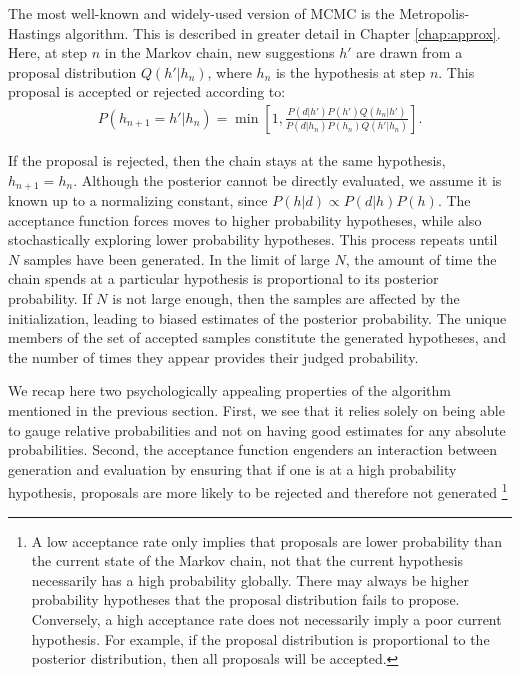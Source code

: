 The most well-known and widely-used version of MCMC is the Metropolis-Hastings algorithm. This is described in greater detail in Chapter \ref{chap:approx}. Here, at step $n$ in the Markov chain, new suggestions $h'$ are drawn from a proposal distribution $Q(h'|h_n)$, where $h_n$ is the hypothesis at step $n$. This proposal is accepted or rejected according to:
\begin{align}
P(h_{n+1}=h'|h_n) = \min\left[1, \frac{P(d|h')P(h') Q(h_n|h')}{P(d|h_n) P(h_n) Q(h'|h_n)} \right].
\end{align}

If the proposal is rejected, then the chain stays at the same hypothesis, $h_{n+1}=h_n$. Although the posterior cannot be directly evaluated, we assume it is known up to a normalizing constant, since $P(h|d) \propto P(d|h) P(h)$. The acceptance function forces moves to higher probability hypotheses, while also stochastically exploring lower probability hypotheses. This process repeats until $N$ samples have been generated. 
In the limit of large $N$, the amount of time the chain spends at a particular hypothesis is proportional to its posterior probability. If $N$ is not large enough, then the samples are affected by the initialization, leading to biased estimates of the posterior probability.
The unique members of the set of accepted samples constitute the generated hypotheses, and the number of times they appear provides their judged probability.

We recap here two psychologically appealing properties of the algorithm mentioned in the previous section. First, we see that it relies solely on being able to gauge relative probabilities and not on having good estimates for any absolute probabilities. Second, the acceptance function engenders an interaction between generation and evaluation by ensuring that if one is at a high probability hypothesis, proposals are more likely to be rejected and therefore not generated%
\footnote{A low acceptance rate only implies that proposals are lower probability than the current state of the Markov chain, not that the current hypothesis necessarily has a high probability globally. There may always be higher probability hypotheses that the proposal distribution fails to propose. Conversely, a high acceptance rate does not necessarily imply a poor current hypothesis. For example, if the proposal distribution is proportional to the posterior distribution, then all proposals will be accepted.}

